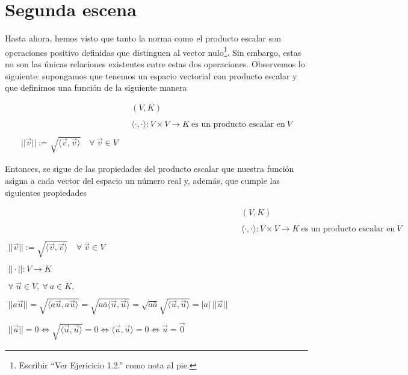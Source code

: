 \documentclass[12pt,dvipsnames]{article}
\numberwithin{equation}{section}
\begin{document}

\newpage
\section{Segunda escena}

Hasta ahora, hemos visto que tanto la norma como el producto escalar son operaciones positivo definidas que distinguen al vector nulo\footnote{Escribir ``Ver Ejericicio 1.2.'' como nota al pie.}. Sin embargo, estas no son las únicas relaciones existentes entre estas dos operaciones. Observemos lo siguiente: supongamos que tenemos un espacio vectorial con producto escalar y que definimos una función de la siguiente manera

\begin{align*}
    & &(V,K) \\
    \\
    & &\langle \cdot , \cdot \rangle : V\times V\to K \ \text{es un producto escalar en} \ V\\
    \\
    ||\vec{v}||:=\sqrt{\langle \vec{v} , \vec{v} \rangle} \quad \forall \ \vec{v}\in V
\end{align*}

Entonces, se sigue de las propiedades del producto escalar que nuestra función asigna a cada vector del espacio un número real y, además, que cumple las siguientes propiedades

\begin{align*}
    & &(V,K) \\
    \\
    & &\langle \cdot , \cdot \rangle : V\times V\to K \ \text{es un producto escalar en} \ V\\
    \\
    ||\vec{v}||:=\sqrt{\langle \vec{v} , \vec{v} \rangle} \quad \forall \ \vec{v}\in V\\
    \\
    ||\cdot||:V\to K\\
    \\
    \forall \ \vec{u}\in V, \ \forall \ a\in K,\\
    \\
    ||a\vec{u}|| = \sqrt{\langle a\vec{u} , a\vec{u} \rangle} = \sqrt{a\overline{a}\langle \vec{u} , \vec{u} \rangle} = \sqrt{a\overline{a}} \sqrt{\langle \vec{u} , \vec{u} \rangle} = |a| \ ||\vec{u}||\\
    \\
    ||\vec{u}|| = 0 \iff \sqrt{\langle \vec{u} , \vec{u} \rangle} = 0 \iff \langle \vec{u} , \vec{u} \rangle = 0 \iff \vec{u} = \vec{0}
\end{align*}
\end{document}
